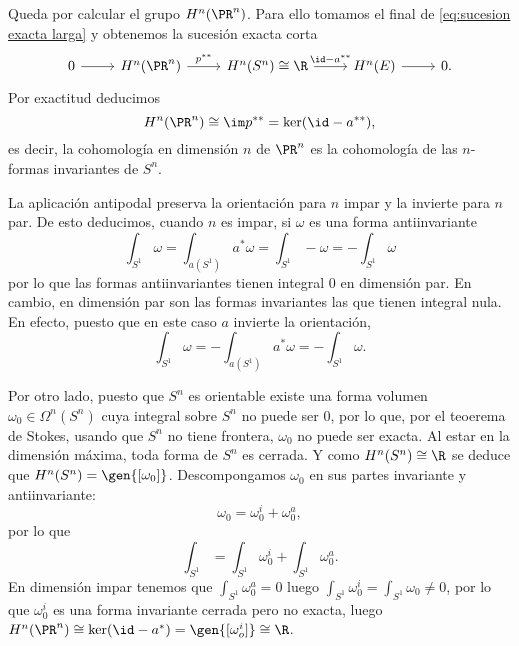 \documentclass[12pt]{article}
\begin{document}
Queda por calcular el grupo \( H^n(\PR^n) \). Para ello tomamos el final de
\eqref{eq:sucesion exacta larga} y obtenemos la sucesión exacta corta
\begin{equation*}
	\begin{tikzcd}
		0 \arrow[r] & H^n(\PR^n) \arrow[r, "p^{\ast \ast}"] & H^n(S^n) \cong \R \arrow[r, "\id -
		a^{\ast \ast}"] & H^n(E) \arrow[r] & 0.
	\end{tikzcd}
\end{equation*}
Por exactitud deducimos
\begin{equation*}
	H^n(\PR^n) \cong \im p^{\ast \ast}= \ker(\id - a^{\ast \ast}),
\end{equation*}
es decir, la cohomología en dimensión \( n \) de \( \PR^n \) es la cohomología de las \(
n \)-formas invariantes de \( S^n \). 

La aplicación antipodal preserva la orientación para \( n \) impar y la invierte para \( n
\) par. De esto deducimos, cuando \( n \) es impar, si \( \omega \) es una forma
antiinvariante
\begin{equation*}
	\int_{S^1} \omega = \int_{a(S^1)} a^\ast \omega = \int_{S^1} -\omega = -\int_{S^1}
	\omega
\end{equation*}
por lo que las formas antiinvariantes tienen integral 0 en dimensión par. En cambio, en
dimensión par son las formas invariantes las que tienen integral nula. En efecto, puesto
que en este caso \( a \) invierte la orientación,
\begin{equation*}
	\int_{S^1} \omega = -\int_{a(S^1)} a^\ast \omega = - \int_{S^1} \omega.
\end{equation*}

Por otro lado, puesto que \( S^n \) es orientable existe una forma volumen \( \omega_0 \in
\Omega^n(S^n) \) cuya integral sobre \( S^n \) no puede ser 0, por lo que, por el teoerema
de Stokes, usando que \( S^n \) no tiene frontera, \( \omega_0 \) no puede ser exacta.  Al
estar en la dimensión máxima, toda forma de \( S^n \) es cerrada.  Y como \( H^n(S^n)
\cong \R \) se deduce que \( H^n(S^n) = \gen{[\omega_0]} \). Descompongamos \( \omega_0 \)
en sus partes invariante y antiinvariante:
\begin{equation*}
	\omega_0 = \omega_0^i + \omega_0^a,
\end{equation*}
por lo que
\begin{equation*}
	\int_{S^1} = \int_{S^1} \omega_0^i + \int_{S^1} \omega_0^a.
\end{equation*}
En dimensión impar tenemos que \( \int_{S^1} \omega_0^a = 0 \) luego \( \int_{S^1}
\omega_0^i = \int_{S^1} \omega_0 \neq 0 \), por lo que \( \omega_0^i \) es una forma
invariante cerrada pero no exacta, luego \( H^n(\PR^n) \cong \ker(\id - a^\ast) =
\gen{[\omega_o^i]} \cong \R \).
\end{document}

